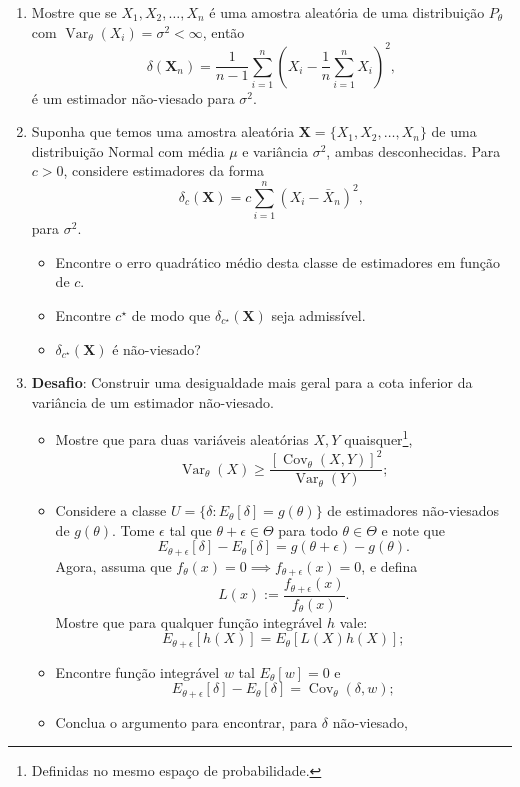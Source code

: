 \documentclass[a4paper,10pt, notitlepage]{report}
\newcommand{\vr}{\operatorname{Var}} %
\newcommand{\rs}{X_1, X_2, \ldots, X_n} %
\newcommand{\bX}{\boldsymbol{X}} %
\begin{document}
\begin{enumerate}
\item Mostre que se $\rs$ é uma amostra aleatória de uma distribuição $P_\theta$ com $\vr_\theta(X_i) = \sigma^2 < \infty$, então
$$\delta(\bX_n) = \frac{1}{n-1} \sum_{i=1}^n \left(X_i - \frac{1}{n}\sum_{i=1}^n X_i\right)^2,$$
é um estimador não-viesado para $\sigma^2$.
\item Suponha que temos uma amostra aleatória $\bX = \{ \rs \}$ de uma distribuição Normal com média $\mu$ e variância $\sigma^2$, ambas desconhecidas.
 Para $c>0$, considere estimadores da forma
\begin{equation}
 \delta_c(\bX) = c\sum_{i=1}^n \left(X_i - \bar{X}_n\right)^2,
\end{equation}
para $\sigma^2$.
\begin{itemize}
 \item Encontre o erro quadrático médio desta classe de estimadores em função de $c$. 
 \item Encontre $c^\star$ de modo que $\delta_{c^\star}(\bX)$ seja admissível.
 \item $\delta_{c^\star}(\bX)$ é não-viesado?
\end{itemize}
    \item \textbf{Desafio}: Construir uma desigualdade mais geral para a cota inferior da variância de um estimador não-viesado.
    \begin{itemize}
        \item Mostre que para duas variáveis aleatórias $X, Y$ quaisquer\footnote{Definidas no mesmo espaço de probabilidade.},
        $$ \vr_\theta(X) \geq \frac{[\operatorname{Cov}_\theta(X, Y)]^2}{\vr_\theta(Y)}; $$
        \item Considere a classe $U = \{ \delta : E_\theta[\delta] = g(\theta) \}$ de estimadores não-viesados de $g(\theta)$.
        Tome $\epsilon$ tal que $\theta + \epsilon \in \Theta$ para todo $\theta \in \Theta$ e note que 
        $$E_{\theta + \epsilon}[\delta] - E_\theta[\delta] = g(\theta + \epsilon) - g(\theta).$$
        Agora, assuma que $f_{\theta}(x) = 0 \implies f_{\theta + \epsilon}(x) = 0$, e defina
        $$ L(x) := \frac{ f_{\theta + \epsilon}(x)}{ f_{\theta}(x)}.$$
        Mostre que para qualquer função integrável $h$ vale:
        $$E_{\theta + \epsilon}[h(X)] = E_{\theta}[L(X)h(X)];$$
        \item Encontre função integrável $w$ tal $E_\theta[w] = 0$ e 
        $$E_{\theta + \epsilon}[\delta] - E_\theta[\delta] = \operatorname{Cov}_\theta(\delta, w);$$
        \item Conclua o argumento para encontrar, para $\delta$ não-viesado,

\end{itemize}
\end{enumerate}
\end{document}
